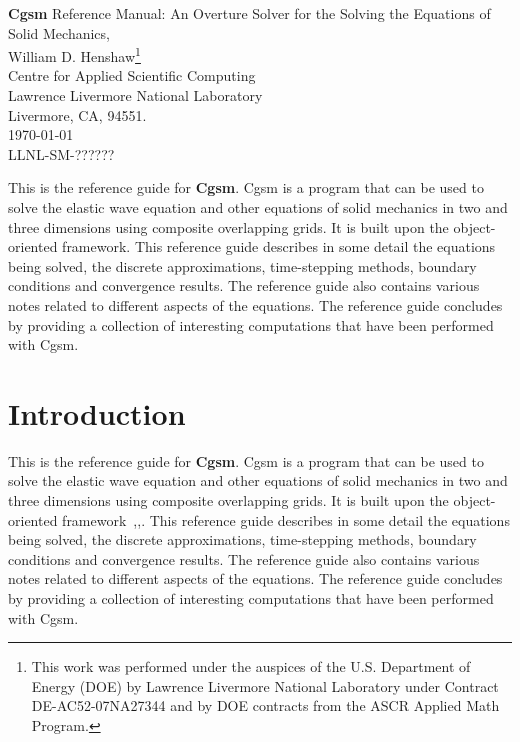 \documentclass[11pt]{article}
\begin{document}
\vspace{5\baselineskip}
\begin{flushleft}
{\Large
{\bf Cgsm} Reference Manual: An Overture Solver for the Solving the Equations of Solid Mechanics, \\
}
\vspace{2\baselineskip}
William D. Henshaw\footnote{This work was performed under the auspices of the U.S. Department of Energy (DOE) by
Lawrence Livermore National Laboratory under Contract DE-AC52-07NA27344 and by 
DOE contracts from the ASCR Applied Math Program.}  \\
Centre for Applied Scientific Computing  \\
Lawrence Livermore National Laboratory      \\
Livermore, CA, 94551.  \\
\vspace{\baselineskip}
\today\\
\vspace{\baselineskip}
LLNL-SM-??????

\vspace{4\baselineskip}


This is the reference guide for {\bf Cgsm}. Cgsm is a program that can be
used to solve the elastic wave equation and other equations of solid mechanics in two and 
three dimensions using composite overlapping grids. It is built upon the
\Overture object-oriented framework.  
This reference guide describes in some detail the equations being solved,
the discrete approximations, time-stepping methods, boundary conditions and convergence results. 
The reference guide also contains various notes related to different aspects of the equations. 
The reference guide concludes by providing a collection of interesting computations that
have been performed with Cgsm. 


\end{flushleft}

\clearpage
\tableofcontents

\vfill\eject


\section{Introduction}

This is the reference guide for {\bf Cgsm}. Cgsm is a program that can be
used to solve the elastic wave equation and other equations of solid mechanics
in two and three dimensions using composite overlapping grids. It is built upon the
\Overture object-oriented framework~\cite{Brown97},\cite{Henshaw96a},\cite{iscope97}. 
This reference guide describes in some detail the equations being solved,
the discrete approximations, time-stepping methods, boundary conditions and convergence results. 
The reference guide also contains various notes related to different aspects of the equations. 
The reference guide concludes by providing a collection of interesting computations that
have been performed with Cgsm.
\end{document}
